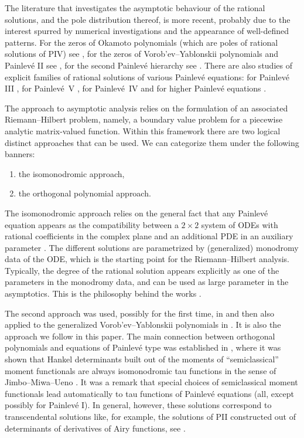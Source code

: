 \documentclass[pdftex]{sigma}
\numberwithin{equation}{section}
\theoremstyle{definition}
\begin{document}
The literature that investigates the asymptotic behaviour of the rational solutions, and the pole distribution thereof, is more recent, probably due to the interest spurred by numerical investigations and the appearance of well-defined patterns. For the zeros of Okamoto polynomials (which are poles of rational solutions of PIV) see \cite{Ref1_3, BuckMill22, Clakxon_IV,Novok14}, for the zeros of Vorob'ev--Yablonskii polynomials and Painlev\'e II see \cite{BertolaBothner, BuckMill14, BuckMill15,Clarxon,Ref1_4}, for the second Painlev\'e hierarchy see \cite{BalBerBo,Clarxon}. There are also studies of explicit families of rational solutions of various Painlev\'e equations: for Painlev\'e III \cite{Ref1_2,Ref1_1, ClaxonIII}, for Painlev\'e~V \cite{Ar1, Ar2,ClarksonV, ClarksonDunning}, for Painlev\'e~IV \cite{Ref1_3, Clakxon_IV, MasoeroIV, MasoeroIV2} and for higher Painlev\'e equations \cite{Ar3,BalBerBo}.

The approach to asymptotic analysis relies on the formulation of an associated Riemann--Hilbert problem, namely, a boundary value problem for a piecewise analytic matrix-valued function.
Within this framework there are two logical distinct approaches that can be used. We can categorize them under the following banners:
\begin{enumerate}\itemsep=0pt\samepage
\item[$(1)$] the isomonodromic approach,
\item[$(2)$] the orthogonal polynomial approach.
\end{enumerate}

\pagebreak

\noindent
The isomonodromic approach relies on the general fact that any Painlev\'e equation appears as the compatibility between a $2\times 2$ system of ODEs with rational coefficients in the complex plane and an additional PDE in an auxiliary parameter \cite{JMU1}. The different solutions are parametrized by (generalized) monodromy data of the ODE, which is the starting point for the Riemann--Hilbert analysis. Typically, the degree of the rational solution appears explicitly as one of the parameters in the monodromy data, and can be used as large parameter in the asymptotics. This is the philosophy behind the works \cite{BuckMill14, BuckMill15}.

The second approach was used, possibly for the first time, in \cite{BertolaBothner} and then also applied to the generalized Vorob'ev--Yablonskii polynomials in \cite{BalBerBo}. It is also the approach we follow in this paper.
The main connection between orthogonal polynomials and equations of Painlev\'e type was established in \cite{Bertola:Semiiso}, where it was shown that Hankel determinants built out of the moments of ``semiclassical'' moment functionals are always isomonodromic tau functions in the sense of Jimbo--Miwa--Ueno \cite{JMU1}. It was a remark \cite[Remark~5.3]{Bertola:Semiiso} that special choices of semiclassical moment functionals lead automatically to tau functions of Painlev\'e equations (all, except possibly for Painlev\'e I). In general, however, these solutions correspond to transcendental solutions like, for example, the solutions of PII constructed out of determinants of derivatives of Airy functions, see \cite{JoshiKajiwara}.
\end{document}
